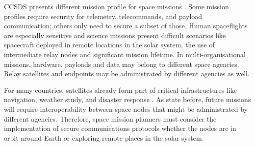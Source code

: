 
CCSDS presents different mission profile for space missions \cite{book2012architecture}. Some mission profiles require security for telemetry, telecommands, and payload communication; others only need to secure a subset of those. Human spaceflights are especially sensitive and science missions present difficult scenarios like spacecraft deployed in remote locations in the solar system, the use of intermediate relay nodes and significant mission lifetime. In multi-organisational missions, hardware, payloads and data may belong to different space agencies. Relay satellites and endpoints may be administrated by different agencies as well.

For many countries, satellites already form part of critical infrastructures like navigation, weather study, and disaster response \cite{book2006security}.  As state before, future missions will require interoperability between space nodes that might be administrated by different agencies. Therefore, space mission planners must consider the implementation of secure communications protocols whether the nodes are in orbit around Earth or exploring remote places in the solar system.


 
 
 
